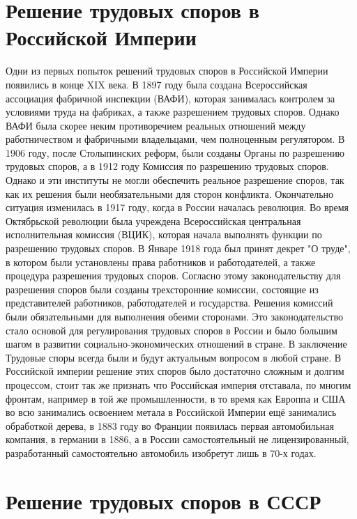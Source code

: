 \section{Решение трудовых споров в Российской Империи}

Одни из первых попыток решений трудовых споров в Российской Империи появились в конце XIX века. В 1897 году была создана Всероссийская ассоциация фабричной инспекции (ВАФИ), которая занималась контролем за условиями труда на фабриках, а также разрешением трудовых споров. Однако ВАФИ была скорее неким противоречием реальных отношений между работничеством и фабричными владельцами, чем полноценным регулятором. В 1906 году, после Столыпинских реформ, были созданы Органы по разрешению трудовых споров, а в 1912 году Комиссия по разрешению трудовых споров. Однако и эти институты не могли обеспечить реальное разрешение споров, так как их решения были необязательными для сторон конфликта. Окончательно ситуация изменилась в 1917 году, когда в России началась революция. Во время Октябрьской революции была учреждена Всероссийская центральная исполнительная комиссия (ВЦИК), которая начала выполнять функции по разрешению трудовых споров. В Январе 1918 года был принят декрет "О труде", в котором были установлены права работников и работодателей, а также процедура разрешения трудовых споров. Согласно этому законодательству для разрешения споров были созданы трехсторонние комиссии, состоящие из представителей работников, работодателей и государства. Решения комиссий были обязательными для выполнения обеими сторонами. Это законодательство стало основой для регулирования трудовых споров в России и было большим шагом в развитии социально-экономических отношений в стране. В заключение Трудовые споры всегда были и будут актуальным вопросом в любой стране. В Российской империи решение этих споров было достаточно сложным и долгим процессом, стоит так же признать что Российская империя отставала, по многим фронтам, например в той же промышленности, в то время как Европпа и США во всю занимались освоением метала в Российской Империи ещё занимались обработкой дерева, в 1883 году во Франции появилась первая автомобильная компания, в германии в 1886, а в России самостоятельный не лицензированный, разработанный самостоятельно автомобиль изобретут лишь в 70-х годах. 

\section{Решение трудовых споров в СССР}

